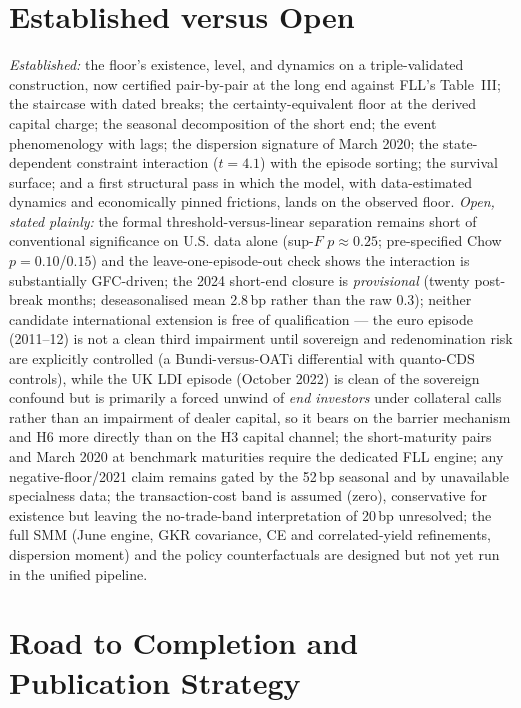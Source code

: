 \documentclass[11pt]{article}
\begin{document}
\section{Established versus Open}

\emph{Established:} the floor's existence, level, and dynamics on a triple-validated construction, now certified pair-by-pair at the long end against FLL's Table~III; the staircase with dated breaks; the certainty-equivalent floor at the derived capital charge; the seasonal decomposition of the short end; the event phenomenology with lags; the dispersion signature of March 2020; the state-dependent constraint interaction ($t=4.1$) with the episode sorting; the survival surface; and a first structural pass in which the model, with data-estimated dynamics and economically pinned frictions, lands on the observed floor. \emph{Open, stated plainly:} the formal threshold-versus-linear separation remains short of conventional significance on U.S. data alone (sup-$F$ $p\approx0.25$; pre-specified Chow $p=0.10$/$0.15$) and the leave-one-episode-out check shows the interaction is substantially GFC-driven; the 2024 short-end closure is \emph{provisional} (twenty post-break months; deseasonalised mean 2.8\,bp rather than the raw 0.3); neither candidate international extension is free of qualification --- the euro episode (2011--12) is not a clean third impairment until sovereign and redenomination risk are explicitly controlled (a Bund\texteuro i-versus-OAT\texteuro i differential with quanto-CDS controls), while the UK LDI episode (October 2022) is clean of the sovereign confound but is primarily a forced unwind of \emph{end investors} under collateral calls rather than an impairment of dealer capital, so it bears on the barrier mechanism and H6 more directly than on the H3 capital channel; the short-maturity pairs and March 2020 at benchmark maturities require the dedicated FLL engine; any negative-floor/2021 claim remains gated by the 52\,bp seasonal and by unavailable specialness data; the transaction-cost band is assumed (zero), conservative for existence but leaving the no-trade-band interpretation of 20\,bp unresolved; the full SMM (June engine, GKR covariance, CE and correlated-yield refinements, dispersion moment) and the policy counterfactuals are designed but not yet run in the unified pipeline.

\section{Road to Completion and Publication Strategy}
\end{document}
